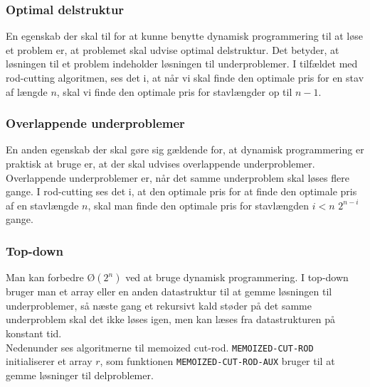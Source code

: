 \subsubsection{Optimal delstruktur}
En egenskab der skal til for at kunne benytte dynamisk programmering til at løse et problem er, at problemet skal udvise optimal delstruktur. Det betyder, at løsningen til et problem indeholder løsningen til underproblemer. I tilfældet med rod-cutting algoritmen, ses det i, at når vi skal finde den optimale pris for en stav af længde $n$, skal vi finde den optimale pris for stavlængder op til $n-1$.

\subsubsection{Overlappende underproblemer}
En anden egenskab der skal gøre sig gældende for, at dynamisk programmering er praktisk at bruge er, at der skal udvises overlappende underproblemer. Overlappende underproblemer er, når det samme underproblem skal løses flere gange. I rod-cutting ses det i, at den optimale pris for at finde den optimale pris af en stavlængde $n$, skal man finde den optimale pris for stavlængden $i < n$ $2^{n-i}$ gange.

\subsubsection{Top-down}
Man kan forbedre $Ø(2^n)$ ved at bruge dynamisk programmering. I top-down bruger man et array eller en anden datastruktur til at gemme løsningen til underproblemer, så næste gang et rekursivt kald støder på det samme underproblem skal det ikke løses igen, men kan læses fra datastrukturen på konstant tid.\\
Nedenunder ses algoritmerne til memoized cut-rod. \texttt{MEMOIZED-CUT-ROD} initialiserer et array $r$, som funktionen \texttt{MEMOIZED-CUT-ROD-AUX} bruger til at gemme løsninger til delproblemer.

